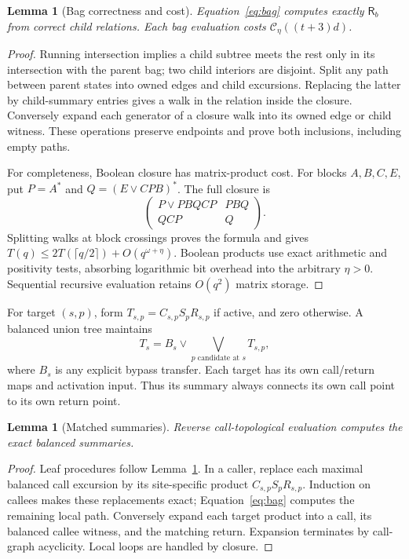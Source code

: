 \documentclass[11pt,letterpaper]{article}
\newtheorem{lemma}[theorem]{Lemma}
\theoremstyle{definition}
\newcommand{\cost}{\mathcal C_\eta}
\newcommand{\Rel}{\mathsf R}
\begin{document}
\begin{lemma}[Bag correctness and cost]\label{lem:bag}
Equation~\eqref{eq:bag} computes exactly $\Rel_b$ from correct child
relations. Each bag evaluation costs $\cost((t+3)d)$.
\end{lemma}
\begin{proof}
Running intersection implies a child subtree meets the rest only in its
intersection with the parent bag; two child interiors are disjoint.
Split any path between parent states into owned edges and child
excursions. Replacing the latter by child-summary entries gives a walk
in the relation inside the closure. Conversely expand each generator of
a closure walk into its owned edge or child witness. These operations
preserve endpoints and prove both inclusions, including empty paths.

For completeness, Boolean closure has matrix-product cost. For blocks
$A,B,C,E$, put $P=A^*$ and $Q=(E\vee CPB)^*$. The full closure is
\[
 \begin{pmatrix}P\vee PBQCP&PBQ\\QCP&Q\end{pmatrix}.
\]
Splitting walks at block crossings proves the formula and gives
$T(q)\le2T(\lceil q/2\rceil)+O(q^{\omega+\eta})$.
Boolean products use exact arithmetic and positivity tests, absorbing
logarithmic bit overhead into the arbitrary $\eta>0$. Sequential
recursive evaluation retains $O(q^2)$ matrix storage.
\end{proof}

For target $(s,p)$, form $T_{s,p}=C_{s,p}S_pR_{s,p}$ if active, and
zero otherwise. A balanced union tree maintains
\begin{equation}\label{eq:targets}
 T_s=B_s\vee\bigvee_{p\text{ candidate at }s}T_{s,p},
\end{equation}
where $B_s$ is any explicit bypass transfer. Each target has its own
call/return maps and activation input. Thus its summary always connects
its own call point to its own return point.

\begin{lemma}[Matched summaries]\label{lem:matching}
Reverse call-topological evaluation computes the exact balanced summaries.
\end{lemma}
\begin{proof}
Leaf procedures follow Lemma~\ref{lem:bag}. In a caller, replace each
maximal balanced call excursion by its site-specific product
$C_{s,p}S_pR_{s,p}$. Induction on callees makes these replacements exact;
Equation~\eqref{eq:bag} computes the remaining local path. Conversely
expand each target product into a call, its balanced callee witness, and
the matching return. Expansion terminates by call-graph acyclicity.
Local loops are handled by closure.
\end{proof}
\end{document}
